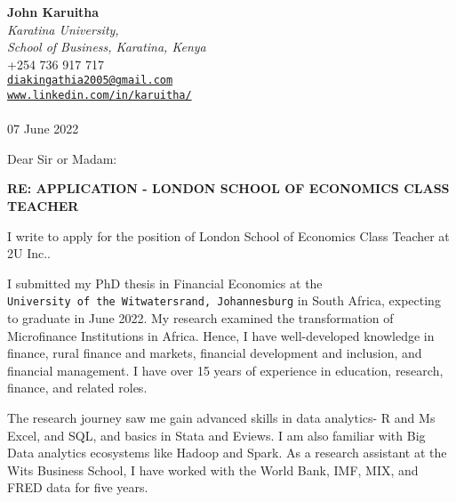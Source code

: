 \documentclass[
  12pt,
]{article}
\author{John Karuitha}
\date{07 June 2022}
\date{}
\begin{document}
\hfill
\begin{minipage}[t]{1\textwidth}
\raggedleft%
{\bfseries John Karuitha }\\[.35ex]
\emph{\small Karatina University,\\
School of Business, Karatina, Kenya} \\[.35ex]
\faPhone \hspace{1 mm} \small{+254 736 917 717} \\ 
\faEnvelopeO \hspace{1 mm} \small{\tt \href{mailto:diakingathia2005@gmail.com}{\nolinkurl{diakingathia2005@gmail.com}}} \\ 
\faGlobe \hspace{1 mm} \small{\href{http://www.linkedin.com/in/karuitha/}{\tt www.linkedin.com/in/karuitha/}}\\ 
\hspace{1cm} \\
 07 June 2022 \\ 
\end{minipage}


\vspace*{1em}

Dear Sir or Madam:

\vspace*{1em}

 

% 
% 

% 
\textbf{RE: APPLICATION - LONDON SCHOOL OF ECONOMICS CLASS TEACHER}

I write to apply for the position of London School of Economics Class
Teacher at 2U Inc..

I submitted my PhD thesis in Financial Economics at the
\texttt{University\ of\ the\ Witwatersrand,\ Johannesburg} in South
Africa, expecting to graduate in June 2022. My research examined the
transformation of Microfinance Institutions in Africa. Hence, I have
well-developed knowledge in finance, rural finance and markets,
financial development and inclusion, and financial management. I have
over 15 years of experience in education, research, finance, and related
roles.

The research journey saw me gain advanced skills in data analytics- R
and Ms Excel, and SQL, and basics in Stata and Eviews. I am also
familiar with Big Data analytics ecosystems like Hadoop and Spark. As a
research assistant at the Wits Business School, I have worked with the
World Bank, IMF, MIX, and FRED data for five years.
\end{document}
